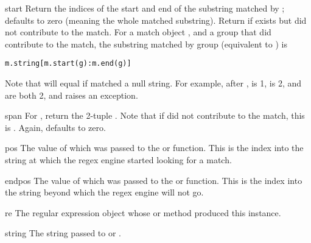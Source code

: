 \begin{methoddesc}[MatchObject]{start}{}
Return the indices of the start and end of the substring
matched by ;  defaults to zero (meaning the whole
matched substring).
Return  if  exists but
did not contribute to the match.  For a match object
, and a group  that did contribute to the match, the
substring matched by group  (equivalent to
) is

\begin{verbatim}
m.string[m.start(g):m.end(g)]
\end{verbatim}

Note that
 will equal  if
 matched a null string.  For example, after ,  is 1,
 is 2,  and
 are both 2, and  raises
an  exception.
\end{methoddesc}

\begin{methoddesc}[MatchObject]{span}{}
For  , return the 2-tuple
.
Note that if  did not contribute to the match, this is
.  Again,  defaults to zero.
\end{methoddesc}

\begin{memberdesc}[MatchObject]{pos}
The value of  which was passed to the
 or  function.  This is the index into
the string at which the regex engine started looking for a match. 
\end{memberdesc}

\begin{memberdesc}[MatchObject]{endpos}
The value of  which was passed to the
 or  function.  This is the index into
the string beyond which the regex engine will not go.
\end{memberdesc}

\begin{memberdesc}[MatchObject]{re}
The regular expression object whose  or
 method produced this  instance.
\end{memberdesc}

\begin{memberdesc}[MatchObject]{string}
The string passed to  or .
\end{memberdesc}

\begin{seealso}
\end{seealso}

